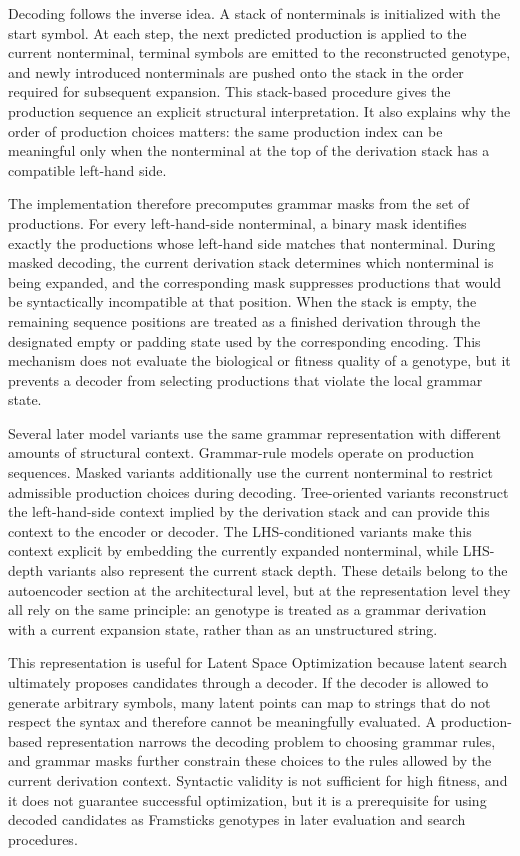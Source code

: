 Decoding follows the inverse idea. A stack of nonterminals is initialized with the start symbol. At each step, the next predicted production is applied to the current nonterminal, terminal symbols are emitted to the reconstructed genotype, and newly introduced nonterminals are pushed onto the stack in the order required for subsequent expansion. This stack-based procedure gives the production sequence an explicit structural interpretation. It also explains why the order of production choices matters: the same production index can be meaningful only when the nonterminal at the top of the derivation stack has a compatible left-hand side.

The implementation therefore precomputes grammar masks from the set of productions. For every left-hand-side nonterminal, a binary mask identifies exactly the productions whose left-hand side matches that nonterminal. During masked decoding, the current derivation stack determines which nonterminal is being expanded, and the corresponding mask suppresses productions that would be syntactically incompatible at that position. When the stack is empty, the remaining sequence positions are treated as a finished derivation through the designated empty or padding state used by the corresponding encoding. This mechanism does not evaluate the biological or fitness quality of a genotype, but it prevents a decoder from selecting productions that violate the local grammar state.

Several later model variants use the same grammar representation with different amounts of structural context. Grammar-rule models operate on production sequences. Masked variants additionally use the current nonterminal to restrict admissible production choices during decoding. Tree-oriented variants reconstruct the left-hand-side context implied by the derivation stack and can provide this context to the encoder or decoder. The LHS-conditioned variants make this context explicit by embedding the currently expanded nonterminal, while LHS-depth variants also represent the current stack depth. These details belong to the autoencoder section at the architectural level, but at the representation level they all rely on the same principle: an \fone{} genotype is treated as a grammar derivation with a current expansion state, rather than as an unstructured string.

This representation is useful for Latent Space Optimization because latent search ultimately proposes candidates through a decoder. If the decoder is allowed to generate arbitrary symbols, many latent points can map to strings that do not respect the \fone{} syntax and therefore cannot be meaningfully evaluated. A production-based representation narrows the decoding problem to choosing grammar rules, and grammar masks further constrain these choices to the rules allowed by the current derivation context. Syntactic validity is not sufficient for high \vertpos{} fitness, and it does not guarantee successful optimization, but it is a prerequisite for using decoded candidates as Framsticks genotypes in later evaluation and search procedures.

